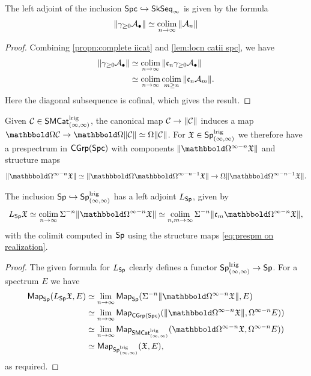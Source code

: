 \documentclass[a4paper,11pt]{article}
\begin{document}
\begin{cor}\label{cor:locn skseq formula}
  The left adjoint of the inclusion $\Spc \hookrightarrow \SkSeqI$ is
  given by the formula
  \[ \|\gamma_{\geq 0}\nA_{\bullet}\| \simeq \colimP_{n \rightarrow \infty} \|\nA_{n}\|\]
\end{cor}
\begin{proof}
  Combining \cref{propn:complete iicat} and \cref{lem:locn catii spc},
  we have
  \[
    \begin{split}
      \|\gamma_{\geq 0}\nA_{\bullet}\| & \simeq \colimP_{n \rightarrow
                                   \infty} \| \core[n]\gamma_{\geq 0}
                                   \nA_{\bullet}\| \\
      & \simeq \colimP_{n \rightarrow \infty}\colimP_{m \geq n}
        \| \core[n]\nA_{m}\|. \\
    \end{split}
  \]
  Here the diagonal subsequence is cofinal, which gives the result.
\end{proof}

\begin{observation}
  Given $\nC \in \SMCatII^{\lrig}$, the canonical map $\nC \to
  \|\nC\|$ induces a map $\mOm \nC \to \mOm\|\nC\| \simeq \Omega
  \|\nC\|$. For $\spX \in \SpIIl$ we therefore have a prespectrum in
  $\CGrp(\Spc)$ with
  components $\|\mOm^{\infty-n}\spX\|$ and
  structure maps
   \begin{equation}
     \label{eq:prespm on realization}
     \|\mOm^{\infty-n}\spX\| \simeq \|\mOm \mOm^{\infty-n-1}\spX\| \to \Omega\|\mOm^{\infty-n-1}\spX\|.
   \end{equation}
\end{observation}

\begin{propn}\label{propn:L SpIIl formula}
  The inclusion $\Sp \hookrightarrow \SpIIl$ has a left adjoint
  $L_{\Sp}$, given by
  \[ L_{\Sp}\spX \simeq \colimP_{n \rightarrow \infty} \Sigma^{-n}
    \|\mOm^{\infty-n}\spX\| \simeq \colimP_{n,m \rightarrow \infty} \Sigma^{-n}
    \|\core[m] \mOm^{\infty-n}\spX\|, \]
  with the colimit computed in $\Sp$ using the structure maps \cref{eq:prespm on realization}.
\end{propn}
\begin{proof}
  The given formula for $L_{\Sp}$ clearly defines a functor $\SpIIl
  \to \Sp$. For a spectrum $E$ we have
  \[
    \begin{split}
      \Map_{\Sp}(L_{\Sp}\spX, E)
      & \simeq \limP_{n \rightarrow \infty}
        \Map_{\Sp}(\Sigma^{-n}\|\mOm^{\infty-n}\spX\|, E) \\
      & \simeq \limP_{n \rightarrow \infty}
        \Map_{\CGrp(\Spc)}(\|\mOm^{\infty-n}\spX\|,
        \Omega^{\infty-n}E)) \\
      & \simeq \limP_{n \rightarrow \infty}
        \Map_{\SMCatII^{\lrig}}(\mOm^{\infty-n}\spX,\Omega^{\infty-n}E))
      \\
      & \simeq \Map_{\SpIIl}(\spX, E),
    \end{split}
  \]
  as required.
\end{proof}
\end{document}
